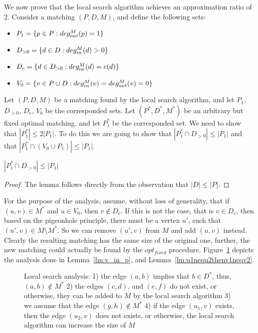 We now prove that the local search algorithm achieves an approximation ratio of $2$.
Consider a matching $(P, D, M)$, and define the following sets:
\begin{itemize}
\item $P_1 = \{p \in P : deg^M_{out}(p) = 1\}$
\item $D_{>0} = \{d \in D : deg^M_{in}(d) > 0\}$
\item $D_c = \{d \in D_{>0} : deg^M_{in}(d) = c(d)\}$
\item $V_0 = \{v \in P \cup D : deg^M_{in}(v) = deg^M_{out}(v) = 0\}$ 
\end{itemize}

Let $(P, D, M)$ be a matching found by the local search algorithm, 
and let $P_1$, $D_{>0}$, $D_c$, $V_0$ be the corresponded sets.
Let $(P^*, D^*, M^*)$ be an arbitrary but fixed optimal matching.
and let $P^*_1$ be the corresponded set.
We need to show that $|P^*_1| \leq 2|P_1|$.
To do this we are going to show that 
$|P^*_1 \cap D_{>0}| \leq |P_1|$ 
and that
$|P^*_1 \cap (V_0 \cup P_1)| \leq |P_1|$.

\begin{lemma}
\label{lm:dleqp}
$|P^*_1 \cap D_{>0}| \leq |P_1|$
\end{lemma}

\begin{proof}
The lemma follows directly from the observation that 
${|D| \leq |P|}$.
\end{proof}

For the purpose of the analysis, assume, without loss of generality, that
if $(u, v) \in M^*$ and $u \in V_0$, then $v \notin D_c$.
If this is not the case, that is $v \in D_c$, then based on the pigeonhole principle,
there must be a vertex $u'$, such that $(u', v) \in M \setminus M^*$.
So we can remove $(u', v)$ from $M$ and add $(u, v)$ instead.
Clearly the resulting matching has the same size of the original one,
further, the new matching could actually be found by the $opt_{fixed}$ procedure.
Figure~\ref{fig:uwcm-illustration} depicts the analysis done in Lemma~\ref{lm:v_in_p},
and Lemma~\ref{lm:u1nequ2thenv1neqv2}.

\begin{figure}
\centering

\caption{
\label{fig:uwcm-illustration}
Local search analysis:
1) the edge $(a,b)$ implies that $b \in D^*$, thus, $(a,b) \notin M^*$
2) the edges $(c,d)$, and $(e,f)$ do not exist, or otherwise, 
they can be added to $M$ by the local search algorithm
3) we assume that the edge $(g,h) \notin M^*$
4) if the edge $(u_1, v)$ exists, then the edge $(u_2, v)$ does not exists, 
or otherwise, the local search algorithm can increase the size of $M$
}
\end{figure}

